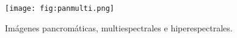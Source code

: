 \begin{frame}{}
  \begin{figure}
    \centering
    \texttt{[image: fig:panmulti.png]}
    \caption{Imágenes pancromáticas, multiespectrales e hiperespectrales.}
    \label{}
  \end{figure}
\end{frame}











\gracias
